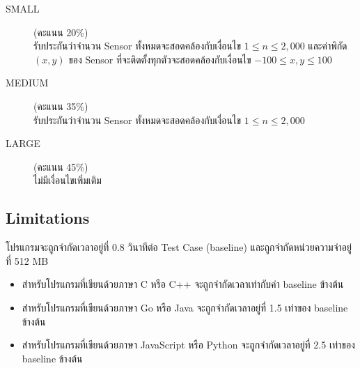 \begin{description}
    \item[SMALL] (คะแนน 20\%) \\
        รับประกันว่าจำนวน Sensor ทั้งหมดจะสอดคล้องกับเงื่อนไข $1 \leq n \leq 2,\!000$ และค่าพิกัด $(x, y)$ ของ Sensor ที่จะติดตั้งทุกตัวจะสอดคล้องกับเงื่อนไข $-100 \leq x, y \leq 100$
    \item[MEDIUM] (คะแนน 35\%) \\
        รับประกันว่าจำนวน Sensor ทั้งหมดจะสอดคล้องกับเงื่อนไข $1 \leq n \leq 2,\!000$
    \item[LARGE] (คะแนน 45\%) \\
        ไม่มีเงื่อนไขเพิ่มเติม
\end{description}


\subsection{Limitations}

\noindent
โปรแกรมจะถูกจำกัดเวลาอยู่ที่ 0.8 วินาทีต่อ Test Case (baseline) และถูกจำกัดหน่วยความจำอยู่ที่ 512 MB
\begin{itemize}
    \item 
        สำหรับโปรแกรมที่เขียนด้วยภาษา C หรือ C++ จะถูกจำกัดเวลาเท่ากับค่า baseline ข้างต้น
    \item 
        สำหรับโปรแกรมที่เขียนด้วยภาษา Go หรือ Java จะถูกจำกัดเวลาอยู่ที่ 1.5 เท่าของ baseline ข้างต้น
    \item 
        สำหรับโปรแกรมที่เขียนด้วยภาษา JavaScript หรือ Python จะถูกจำกัดเวลาอยู่ที่ 2.5 เท่าของ baseline ข้างต้น
\end{itemize}